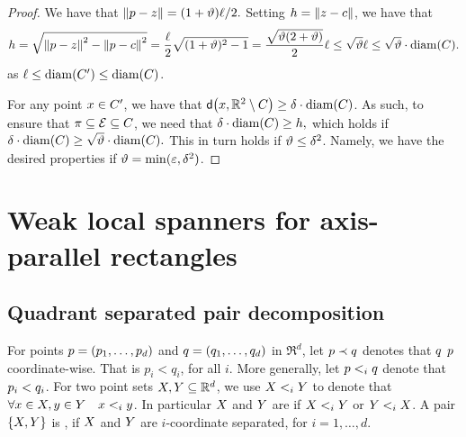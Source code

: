 \documentclass[12pt]{article}%
\begin{document}
\begin{proof}
    We have that
    \begin{math}
        \left\| p - z \right\| = (1+\vartheta)\ell/2.
    \end{math}
    Setting $h = \left\| z - c \right\|$, we have that
    \begin{equation*}
        h%
        =%
        \sqrt{\dY{\pa}{\pz}^2 - \dY{\pa}{\cen}^2 }
        =%
        \frac{\ell}{2} \sqrt{(1+\epsA)^2 - 1}
        =%
        \frac{\sqrt{\epsA (2+\epsA)}}{2} \ell%
        \leq 
        \sqrt{\epsA} \ell
        \leq 
        \sqrt{\epsA}\cdot \diameterX{\body}.
    \end{equation*}
    as $\ell \leq \diameterX{\body'} \leq \diameterX{\body}$.

    For any point $x \in C'$, we have that
    $\dsY{\px}{\Re^2 \setminus \body} \geq \delta \cdot
    \diamX{\body}$.  As such, to ensure that
    $\pi \subseteq \mathcal{E} \subseteq C$, we need that
    \begin{math}
        \delta \cdot \diamX{\body} \geq h,
    \end{math}
    which holds if
    \begin{math}
        \delta \cdot \diamX{\body} \geq \sqrt{\epsA} \cdot
        \diameterX{\body}.
    \end{math}
    This in turn holds if $\vartheta \leq \delta^2$. Namely, we have the
    desired properties if $\vartheta = \min( \varepsilon, \delta^2)$.
\end{proof}




\section{Weak local spanners for axis-parallel rectangles}
\subsection{Quadrant separated pair decomposition}

For points $p = (p_1, \ldots, p_d)$ and $q = (q_1, \ldots, q_d)$
in $\Re^d$, let $p \prec q$ denotes that $q$ 
$p$ coordinate-wise. That is $p_i < q_i$, for all $i$. More
generally, let $p <_i q$ denote that $p_i < q_i$. For two
point sets $X, Y \subseteq \mathbb{R}^d$, we use $X <_i Y$ to
denote that $\forall x \in X, y \in Y \quad x <_i y$.
In particular $X$ and $Y$ are 
if $X <_i Y$ or $Y <_i X$. A pair $\{ X, Y\}$ is
, if $X$ and $Y$ are $i$-coordinate
separated, for $i=1,\ldots, d$.
\end{document}
